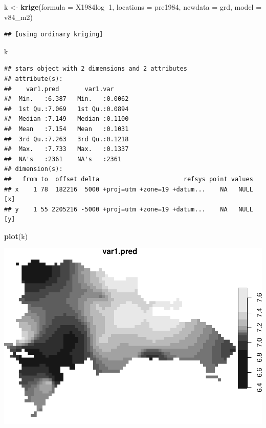 \documentclass[11pt,]{article}
\newenvironment{Shaded}{\begin{snugshade}}{\end{snugshade}}
\newcommand{\KeywordTok}[1]{\textcolor[rgb]{0.13,0.29,0.53}{\textbf{#1}}}
\newcommand{\DataTypeTok}[1]{\textcolor[rgb]{0.13,0.29,0.53}{#1}}
\newcommand{\DecValTok}[1]{\textcolor[rgb]{0.00,0.00,0.81}{#1}}
\newcommand{\StringTok}[1]{\textcolor[rgb]{0.31,0.60,0.02}{#1}}
\newcommand{\OperatorTok}[1]{\textcolor[rgb]{0.81,0.36,0.00}{\textbf{#1}}}
\newcommand{\NormalTok}[1]{#1}
\begin{document}
\begin{Shaded}
\begin{Highlighting}[]
\NormalTok{k <-}\StringTok{ }\KeywordTok{krige}\NormalTok{(}\DataTypeTok{formula =}\NormalTok{ X1984log}\OperatorTok{~}\DecValTok{1}\NormalTok{, }\DataTypeTok{locations =}\NormalTok{ pre1984, }\DataTypeTok{newdata =}\NormalTok{ grd, }\DataTypeTok{model =}\NormalTok{ v84_m2) }
\end{Highlighting}
\end{Shaded}

\begin{verbatim}
## [using ordinary kriging]
\end{verbatim}

\begin{Shaded}
\begin{Highlighting}[]
\NormalTok{k}
\end{Highlighting}
\end{Shaded}

\begin{verbatim}
## stars object with 2 dimensions and 2 attributes
## attribute(s):
##    var1.pred       var1.var      
##  Min.   :6.387   Min.   :0.0062  
##  1st Qu.:7.069   1st Qu.:0.0894  
##  Median :7.149   Median :0.1100  
##  Mean   :7.154   Mean   :0.1031  
##  3rd Qu.:7.263   3rd Qu.:0.1218  
##  Max.   :7.733   Max.   :0.1337  
##  NA's   :2361    NA's   :2361    
## dimension(s):
##   from to  offset delta                       refsys point values    
## x    1 78  182216  5000 +proj=utm +zone=19 +datum...    NA   NULL [x]
## y    1 55 2205216 -5000 +proj=utm +zone=19 +datum...    NA   NULL [y]
\end{verbatim}

\begin{Shaded}
\begin{Highlighting}[]
\KeywordTok{plot}\NormalTok{(k)}
\end{Highlighting}
\end{Shaded}

\includegraphics{proyecto_files/figure-latex/unnamed-chunk-37-2.pdf}
\end{document}
